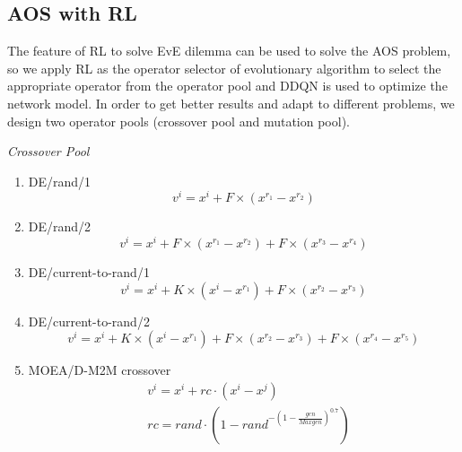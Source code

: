 \documentclass[journal]{IEEEtran}
\begin{document}
\subsection{AOS with RL}
The feature of RL to solve EvE dilemma can be used to solve the AOS problem, so we apply RL as the operator selector of evolutionary algorithm to select the appropriate operator from the operator pool  and DDQN is used to optimize the network model.
In order to get better results and adapt to different problems, we design two operator pools (crossover pool and mutation pool).

\textit{Crossover Pool}
\begin{enumerate}
  \item DE/rand/1
        \begin{equation}
          v^{i}=x^{i}+F \times\left(x^{r_{1}}-x^{r_{2}}\right)
          \label{de1}
        \end{equation}
  \item DE/rand/2
        \begin{equation}
          v^{i}=x^{i}+F \times\left(x^{r_1}-x^{r_2}\right)+F \times\left(x^{r_3}-x^{r_4}\right)
          \label{de2}
        \end{equation}
  \item DE/current-to-rand/1
        \begin{equation}
          v^{i}=x^{i}+K \times\left(x^{i}-x^{r_{1}}\right)+F \times\left(x^{r_{2}}-x^{r_{3}}\right)
        \end{equation}
  \item DE/current-to-rand/2
        \begin{equation}
          v^{i}=x^{i}+K \times\left(x^{i}-x^{r_{1}}\right)+F \times\left(x^{r_{2}}-x^{r_{3}}\right)+F \times\left(x^{r_{4}}-x^{r_{5}}\right)
        \end{equation}
  \item MOEA/D-M2M crossover
        \begin{align}
           & v^{i}=x^{i}+rc \cdot\left(x^{i}-x^{j}\right)                                    \\
           & rc={rand} \cdot\left(1-{rand}^{-\left(1-\frac{gen}{Maxgen}\right)^{0.7}}\right)
          \label{m2m:cro}
        \end{align}
\end{enumerate}
\end{document}
